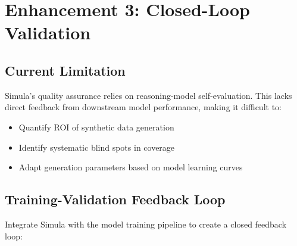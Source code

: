\documentclass[12pt,a4paper,twoside]{report}
\begin{document}
\section{Enhancement 3: Closed-Loop Validation}

\subsection{Current Limitation}

Simula's quality assurance relies on reasoning-model self-evaluation. This lacks
direct feedback from downstream model performance, making it difficult to:
\begin{itemize}
\item Quantify ROI of synthetic data generation
\item Identify systematic blind spots in coverage
\item Adapt generation parameters based on model learning curves
\end{itemize}

\subsection{Training-Validation Feedback Loop}

Integrate Simula with the model training pipeline to create a closed feedback loop:
\end{document}
